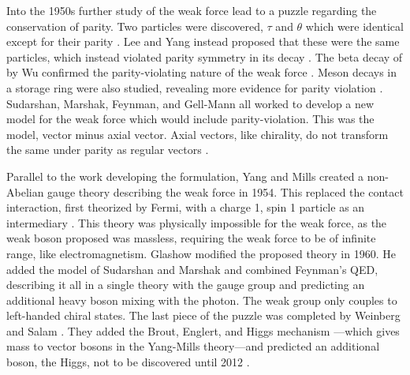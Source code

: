 Into the 1950s further study of the weak force lead to a puzzle regarding the conservation of parity.  Two particles were discovered, \ensuremath{\tau} and \ensuremath{\theta} which were identical except for their parity \cite{osti_4356004}.  Lee and Yang instead proposed that these were the same particles, which instead violated parity symmetry in its decay \cite{PhysRev.104.254}.  The beta decay of \cobaltsixty by Wu confirmed the parity-violating nature of the weak force \cite{articlePARITYTEST}.  Meson decays in a storage ring were also studied, revealing more evidence for parity violation \cite{articlePARITYFAIL}.  Sudarshan, Marshak, Feynman, and Gell-Mann all worked to develop a new model for the weak force which would include parity-violation.  This was the \vminusa  model, vector minus axial vector. Axial vectors, like chirality, do not transform the same under parity as regular vectors \cite{1898KNAB1427L}\cite{PhysRev.109.193}.

Parallel to the work developing the \vminusa formulation, Yang and Mills created a non-Abelian gauge theory describing the weak force in 1954.  This replaced the contact interaction, first theorized by Fermi, with a charge 1, spin 1 particle as an intermediary \cite{PhysRev.96.191}.  This theory was physically impossible for the weak force, as the weak boson proposed was massless, requiring the weak force to be of infinite range, like electromagnetism.  Glashow modified the proposed theory in 1960.  He added the \vminusa model of Sudarshan and Marshak and combined Feynman's QED, describing it all in a single theory with the gauge group \SUtwoUone \cite{GLASHOW1961579} and predicting an additional heavy boson mixing with the photon.  The weak \SUtwoL group only couples to left-handed chiral states.  The last piece of the puzzle was completed by Weinberg and Salam \cite{PhysRevLett.19.1264}\cite{nla.cat-vn956113}.  They added the Brout, Englert, and Higgs mechanism \cite{PhysRevLett.13.321}\cite{PhysRevLett.13.508} ---which gives mass to vector bosons in the Yang-Mills theory---and predicted an additional boson, the Higgs, not to be discovered until 2012 \cite{higgs2012ATLAS}\cite{higgs2012CMS}.

